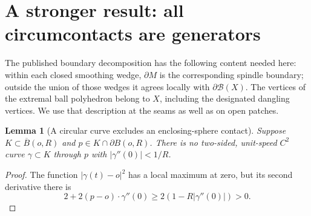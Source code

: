 \documentclass[11pt]{article}
\newtheorem{lemma}[theorem]{Lemma}
\theoremstyle{remark}\newtheorem{remark}[theorem]{Remark}
\newcommand{\B}{\mathcal B}
\begin{document}
\section{A stronger result: all circumcontacts are generators}
The published boundary decomposition \cite[Proposition 4.5]{HyndDensity} has
the following content needed here: within each closed smoothing wedge,
$\partial M$ is the corresponding spindle boundary; outside the union of
those wedges it agrees locally with $\partial\B(X)$. The vertices of the
extremal ball polyhedron belong to $X$, including the designated dangling
vertices. We use that description at the seams as well as on open patches.

\begin{lemma}[A circular curve excludes an enclosing-sphere contact]\label{jiang:curve}
Suppose $K\subset\overline B(o,R)$ and $p\in K\cap\partial B(o,R)$.
There is no two-sided, unit-speed $C^2$ curve $\gamma\subset K$ through
$p$ with $|\gamma''(0)|<1/R$.
\end{lemma}
\begin{proof}
The function $|\gamma(t)-o|^2$ has a local maximum at zero, but its
second derivative there is
\[
 2+2(p-o)\cdot\gamma''(0)\geq2(1-R|\gamma''(0)|)>0.
\]
\end{proof}
\end{document}
